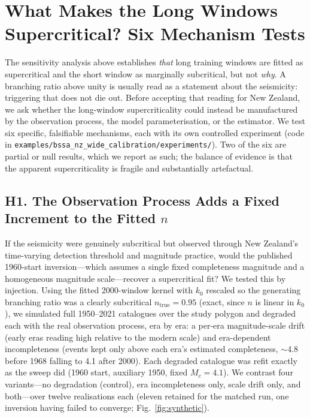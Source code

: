 
\section*{What Makes the Long Windows Supercritical? Six Mechanism Tests}

The sensitivity analysis above establishes \emph{that} long training windows are
fitted as supercritical and the short window as marginally subcritical, but not
\emph{why}. A branching ratio above unity is usually read as a statement about the
seismicity: triggering that does not die out. Before accepting that reading for
New Zealand, we ask whether the long-window supercriticality could instead be
manufactured by the observation process, the model parameterisation, or the
estimator. We test six specific, falsifiable mechanisms, each with its own
controlled experiment (code in
\nolinkurl{examples/bssa_nz_wide_calibration/experiments/}). Two of the six are
partial or null results, which we report as such; the balance of evidence is that
the apparent supercriticality is fragile and substantially artefactual.

\subsection*{H1. The Observation Process Adds a Fixed Increment to the Fitted $n$}

If the seismicity were genuinely subcritical but observed through New Zealand's
time-varying detection threshold and magnitude practice, would the published
1960-start inversion---which assumes a single fixed completeness magnitude and a
homogeneous magnitude scale---recover a supercritical fit? We tested this by
injection. Using the fitted 2000-window kernel with $k_0$ rescaled so the
generating branching ratio was a clearly subcritical $n_{\mathrm{true}}=0.95$
(exact, since $n$ is linear in $k_0$), we simulated full 1950--2021 catalogues
over the study polygon and degraded each with the real observation process, era by
era: a per-era magnitude-scale drift (early eras reading high relative to the
modern scale) and era-dependent incompleteness (events kept only above each era's
estimated completeness, $\sim$4.8 before 1968 falling to 4.1 after 2000). Each
degraded catalogue was refit exactly as the sweep did (1960 start, auxiliary
1950, fixed $M_c=4.1$). We contrast four variants---no degradation (control), era
incompleteness only, scale drift only, and both---over twelve realisations each
(eleven retained for the matched run, one inversion having failed to converge;
Fig.~\ref{fig:synthetic}).

